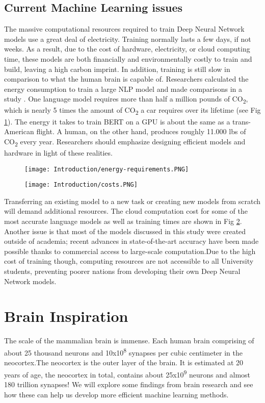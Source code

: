 \documentclass[12pt]{report}
\begin{document}
\section{Current Machine Learning issues}
The massive computational resources required to train Deep Neural Network models use a great deal of electricity. Training normally lasts a few days, if not weeks. As a result, due to the cost of hardware, electricity, or cloud computing time, these models are both financially and environmentally costly to train and build, leaving a high carbon imprint. In addition, training is still slow in comparison to what the human brain is capable of. Researchers calculated the energy consumption to train a large NLP model and made comparisons in a study \cite{Strubell2019}. One language model requires more than half a million pounds of CO\textsubscript{2}, which is nearly 5 times the amount of CO\textsubscript{2} a car requires over its lifetime (see Fig \ref{fig:energy-requirements}). The energy it takes to train BERT on a GPU is about the same as a trans-American flight. A human, on the other hand, produces roughly 11.000 lbs of CO\textsubscript{2} every year. Researchers should emphasize designing efficient models and hardware in light of these realities.

\begin{figure}[htp]
    \centering
    \texttt{[image: Introduction/energy-requirements.PNG]}
    \caption{}
    \label{fig:energy-requirements}
\end{figure}
\begin{figure}[htp]
    \centering
    \texttt{[image: Introduction/costs.PNG]}
    \caption{}
    \label{fig:costs}
\end{figure}

Transferring an existing model to a new task or creating new models from scratch will demand additional resources. The cloud computation cost for some of the most accurate language models as well as training times are shown in Fig \ref{fig:costs}. Another issue is that most of the models discussed in this study \cite{Strubell2019} were created outside of academia; recent advances in state-of-the-art accuracy have been made possible thanks to commercial access to large-scale computation.Due to the high cost of training though, computing resources are not accessible to all University students, preventing poorer nations from developing their own Deep Neural Network models.

\chapter{Brain Inspiration}
The scale of the mammalian brain is immense. Each human brain comprising of about 25 thousand neurons and  10x10\textsuperscript{8} synapses per cubic centimeter \cite{nguyen2013} in the neocortex.The neocortex is the outer layer of the brain. It is estimated at 20 years of age, the neocortex in total, contains about 25x10\textsuperscript{9} neurons and almost 180 trillion synapses! We will explore some findings from brain research and see how these can help us develop more efficient machine learning methods.
\end{document}
